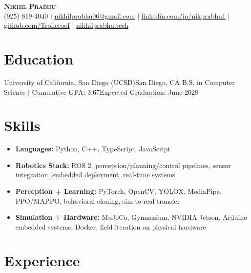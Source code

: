 




\begin{center}
    \textbf{\Large \scshape Nikhil Prabhu} \\ \vspace{1pt}
    \small (925) 819-4040 $|$ \href{mailto:nikhilprabhu06@gmail.com}{\underline{nikhilprabhu06@gmail.com}} $|$ 
    \href{https://www.linkedin.com/in/nikprabhu1/}{\underline{linkedin.com/in/nikprabhu1}} $|$
    \href{https://github.com/Trolleroof}{\underline{github.com/Trolleroof}} $|$
    \href{https://nikhilprabhu.tech}{\underline{nikhilprabhu.tech}}
\end{center}
\small

\section{Education}
  \resumeSubHeadingListStart
    \resumeSubheading
      {University of California, San Diego (UCSD)}{San Diego, CA}
      {B.S. in Computer Science $|$ Cumulative GPA: 3.67}{Expected Graduation: June 2028}
  \resumeSubHeadingListEnd
\vspace{-4pt}

\section{Skills}
\begin{itemize}[leftmargin=0.15in, label={}, nosep, topsep=2pt, itemsep=3pt, parsep=0pt]
  \item \textbf{Languages:} Python, C++, TypeScript, JavaScript
  \item \textbf{Robotics Stack:} ROS 2, perception/planning/control pipelines, sensor integration, embedded deployment, real-time systems
  \item \textbf{Perception + Learning:} PyTorch, OpenCV, YOLOX, MediaPipe, PPO/MAPPO, behavioral cloning, sim-to-real transfer
  \item \textbf{Simulation + Hardware:} MuJoCo, Gymnasium, NVIDIA Jetson, Arduino embedded systems, Docker, field iteration on physical hardware
\end{itemize}
\vspace{-4pt}

\section{Experience}
  \resumeSubHeadingListStart

